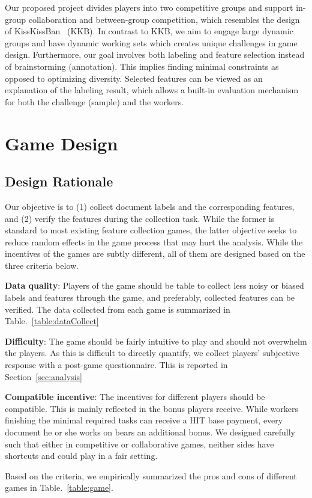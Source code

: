\documentclass[chi_draft]{sigchi}
\begin{document}
Our proposed project divides players into two competitive groups and support in-group collaboration and between-group competition, which resembles the design of KissKissBan~\cite{ho2009kisskissban} (KKB). In contrast to KKB, we aim to engage large dynamic groups and have dynamic working sets which creates unique challenges in game design. Furthermore, our goal involves both labeling and feature selection instead of brainstorming (annotation). This implies finding minimal constraints as opposed to optimizing diversity. Selected features can be viewed as an explanation of the labeling result, which allows a built-in evaluation mechanism for both the challenge (sample) and the workers. 


\section{Game Design}

\subsection{Design Rationale}
Our objective is to (1) collect document labels and the corresponding features, and (2) verify the features during the collection task. While the former is standard to most existing feature collection games, the latter objective seeks to reduce random effects in the game process that may hurt the analysis.
While the incentives of the games are subtly different, all of them are designed based on the three criteria below.

\begin{compactitem}
  \item \textbf{Data quality}: Players of the game should be table to collect less noisy or biased labels and features through the game, and preferably, collected features can be verified. The data collected from each game is summarized in Table.~\ref{table:dataCollect}
  \item \textbf{Difficulty}: The game should be fairly intuitive to play and should not overwhelm the players. As this is difficult to directly quantify, we collect players' subjective response with a post-game questionnaire. This is reported in Section~\ref{sec:analysis}
  \item \textbf{Compatible incentive}: The incentives for different players should be compatible. This is mainly reflected in the bonus players receive. While workers finishing the minimal required tasks can receive a HIT base payment, every document he or she works on bears an additional bonus. We designed carefully such that either in competitive or collaborative games, neither sides have shortcuts and could play in a fair setting. 
\end{compactitem}
Based on the criteria, we empirically summarized the pros and cons of different games in Table.~\ref{table:game}.
\end{document}
